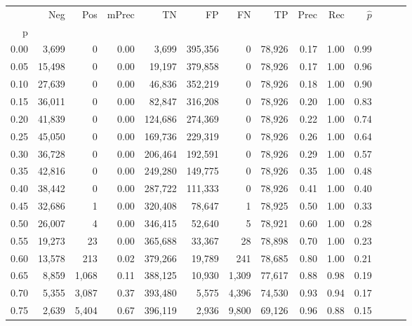 \begin{tabular}{rrrrrrrrrrrrrr}
\toprule
{} &     Neg &     Pos & mPrec &       TN &       FP &      FN &      TP &  Prec &   Rec & $\hat{p}$ \\
p    &         &         &       &          &          &         &         &       &       &           \\
\midrule
0.00 &   3,699 &       0 &  0.00 &    3,699 &  395,356 &       0 &  78,926 &  0.17 &  1.00 &      0.99 \\
0.05 &  15,498 &       0 &  0.00 &   19,197 &  379,858 &       0 &  78,926 &  0.17 &  1.00 &      0.96 \\
0.10 &  27,639 &       0 &  0.00 &   46,836 &  352,219 &       0 &  78,926 &  0.18 &  1.00 &      0.90 \\
0.15 &  36,011 &       0 &  0.00 &   82,847 &  316,208 &       0 &  78,926 &  0.20 &  1.00 &      0.83 \\
0.20 &  41,839 &       0 &  0.00 &  124,686 &  274,369 &       0 &  78,926 &  0.22 &  1.00 &      0.74 \\
0.25 &  45,050 &       0 &  0.00 &  169,736 &  229,319 &       0 &  78,926 &  0.26 &  1.00 &      0.64 \\
0.30 &  36,728 &       0 &  0.00 &  206,464 &  192,591 &       0 &  78,926 &  0.29 &  1.00 &      0.57 \\
0.35 &  42,816 &       0 &  0.00 &  249,280 &  149,775 &       0 &  78,926 &  0.35 &  1.00 &      0.48 \\
0.40 &  38,442 &       0 &  0.00 &  287,722 &  111,333 &       0 &  78,926 &  0.41 &  1.00 &      0.40 \\
0.45 &  32,686 &       1 &  0.00 &  320,408 &   78,647 &       1 &  78,925 &  0.50 &  1.00 &      0.33 \\
0.50 &  26,007 &       4 &  0.00 &  346,415 &   52,640 &       5 &  78,921 &  0.60 &  1.00 &      0.28 \\
0.55 &  19,273 &      23 &  0.00 &  365,688 &   33,367 &      28 &  78,898 &  0.70 &  1.00 &      0.23 \\
0.60 &  13,578 &     213 &  0.02 &  379,266 &   19,789 &     241 &  78,685 &  0.80 &  1.00 &      0.21 \\
0.65 &   8,859 &   1,068 &  0.11 &  388,125 &   10,930 &   1,309 &  77,617 &  0.88 &  0.98 &      0.19 \\
0.70 &   5,355 &   3,087 &  0.37 &  393,480 &    5,575 &   4,396 &  74,530 &  0.93 &  0.94 &      0.17 \\
0.75 &   2,639 &   5,404 &  0.67 &  396,119 &    2,936 &   9,800 &  69,126 &  0.96 &  0.88 &      0.15 \\

\end{tabular}
